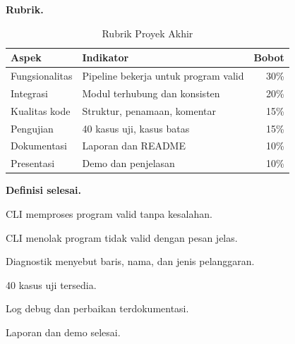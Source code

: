 \textbf{Rubrik.}
\begin{table}[H]
\centering
\caption{Rubrik Proyek Akhir}
\label{tab:ch16-rubrik}
\begin{tabularx}{\textwidth}{@{}lXr@{}}
\toprule
\textbf{Aspek} & \textbf{Indikator} & \textbf{Bobot} \\
\midrule
Fungsionalitas & Pipeline bekerja untuk program valid & 30\% \\
Integrasi & Modul terhubung dan konsisten & 20\% \\
Kualitas kode & Struktur, penamaan, komentar & 15\% \\
Pengujian & 40 kasus uji, kasus batas & 15\% \\
Dokumentasi & Laporan dan README & 10\% \\
Presentasi & Demo dan penjelasan & 10\% \\
\bottomrule
\end{tabularx}
\end{table}

\textbf{Definisi selesai.}
\begin{checklist}
  \item CLI memproses program valid tanpa kesalahan.
  \item CLI menolak program tidak valid dengan pesan jelas.
  \item Diagnostik menyebut baris, nama, dan jenis pelanggaran.
  \item 40 kasus uji tersedia.
  \item Log debug dan perbaikan terdokumentasi.
  \item Laporan dan demo selesai.
\end{checklist}
